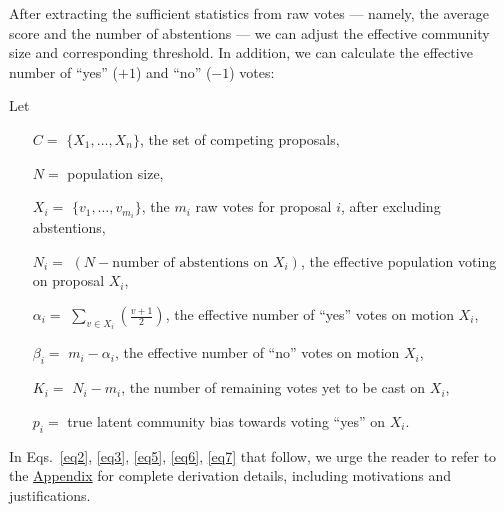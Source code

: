\documentclass[format=acmsmall, review=true, screen=true, anonymous=true]{acmart}
\begin{document}
After extracting the sufficient statistics from raw votes --- namely, the average score and the number of abstentions --- we can adjust the effective community size and corresponding threshold.  In addition, we can calculate the effective number of ``yes'' ($+1$) and ``no'' ($-1$) votes:

Let

\begin{itemize}
\item[$C = $] $\{X_1,\ldots, X_n\}$, the set of competing proposals,
\item[$N = $] population size,
\item[$X_i = $] $\{v_1, \ldots, v_{m_i}\}$, the $m_i$ raw votes for proposal $i$, after excluding abstentions,
\item[$N_i = $] $(N - \textrm{number of abstentions on } X_i)$, the effective population voting on proposal $X_i$,
\item[$\alpha_i = $] $\sum\limits_{v \in X_i}\left(\frac{v+1}{2}\right)$, the effective number of ``yes'' votes on motion $X_i$,
\item[$\beta_i = $] $m_i - \alpha_i$, the effective number of ``no'' votes on motion $X_i$,
\item[$K_i = $] $N_i - m_i$, the number of remaining votes yet to be cast on $X_i$,
\item[$p_i = $] true latent community bias towards voting ``yes'' on $X_i$.
\end{itemize}


In Eqs.~\eqref{eq2}, \eqref{eq3}, \eqref{eq5}, \eqref{eq6}, \eqref{eq7} that follow, we urge the reader to refer to the \hyperref[sec:derivation]{Appendix} for complete derivation details, including motivations and justifications.
\end{document}
